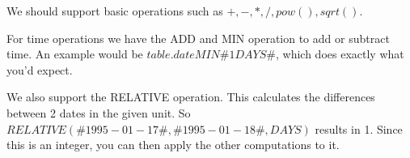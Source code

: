We should support basic operations such as $+, -, *, /, pow(), sqrt()$.

For time operations we have the ADD and MIN operation to add or subtract time. An example would be $table.date MIN \#1 DAYS\#$, which does exactly what you'd expect.

We also support the RELATIVE operation. This calculates the differences between 2 dates in the given unit. So $RELATIVE(\#1995-01-17\#, \#1995-01-18\#, DAYS)$ results in 1. Since this is an integer, you can then apply the other computations to it.
